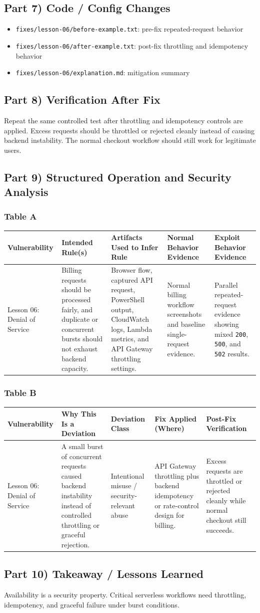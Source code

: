 \documentclass[12pt]{article}
\makeatletter
\newcommand{\analysistables}[9]{
\subsubsection*{Table A}
{\footnotesize
\begin{longtable}{@{}p{0.13\textwidth}p{0.18\textwidth}p{0.17\textwidth}p{0.16\textwidth}p{0.16\textwidth}@{}}
\toprule
Vulnerability & Intended Rule(s) & Artifacts Used to Infer Rule & Normal Behavior Evidence & Exploit Behavior Evidence \\
\midrule
#1 & #2 & #3 & #4 & #5 \\
\bottomrule
\end{longtable}
}

\subsubsection*{Table B}
{\footnotesize
\begin{longtable}{@{}p{0.13\textwidth}p{0.18\textwidth}p{0.13\textwidth}p{0.18\textwidth}p{0.16\textwidth}@{}}
\toprule
Vulnerability & Why This Is a Deviation & Deviation Class & Fix Applied (Where) & Post-Fix Verification \\
\midrule
#1 & #6 & #7 & #8 & #9 \\
\bottomrule
\end{longtable}
}
}
\makeatother
\begin{document}
\subsection*{Part 7) Code / Config Changes}
\begin{itemize}
\item \texttt{fixes/lesson-06/before-example.txt}: pre-fix repeated-request behavior
\item \texttt{fixes/lesson-06/after-example.txt}: post-fix throttling and idempotency behavior
\item \texttt{fixes/lesson-06/explanation.md}: mitigation summary
\end{itemize}

\subsection*{Part 8) Verification After Fix}
Repeat the same controlled test after throttling and idempotency controls are applied. Excess requests should be throttled or rejected cleanly instead of causing backend instability. The normal checkout workflow should still work for legitimate users.

\subsection*{Part 9) Structured Operation and Security Analysis}
\analysistables
{Lesson 06: Denial of Service}
{Billing requests should be processed fairly, and duplicate or concurrent bursts should not exhaust backend capacity.}
{Browser flow, captured API request, PowerShell output, CloudWatch logs, Lambda metrics, and API Gateway throttling settings.}
{Normal billing workflow screenshots and baseline single-request evidence.}
{Parallel repeated-request evidence showing mixed \texttt{200}, \texttt{500}, and \texttt{502} results.}
{A small burst of concurrent requests caused backend instability instead of controlled throttling or graceful rejection.}
{Intentional misuse / security-relevant abuse}
{API Gateway throttling plus backend idempotency or rate-control design for billing.}
{Excess requests are throttled or rejected cleanly while normal checkout still succeeds.}

\subsection*{Part 10) Takeaway / Lessons Learned}
Availability is a security property. Critical serverless workflows need throttling, idempotency, and graceful failure under burst conditions.
\end{document}
